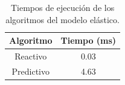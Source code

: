 \begin{table}[!ht]
\centering
\begin{tabular}{| c | c |}
\hline
Algoritmo & Tiempo (ms) \\ \hline
Reactivo & 0.03 \\
Predictivo & 4.63 \\ \hline
\end{tabular}
\caption{Tiempos de ejecución de los algoritmos del modelo elástico.}
\label{tab:tiempo-algoritmos}
\end{table}


%
%
%
%
